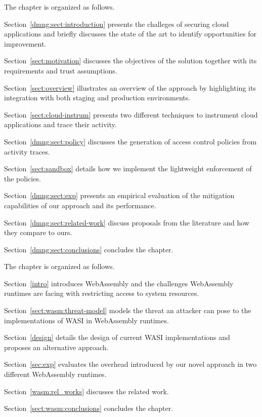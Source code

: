 \smallskip
\noindent The chapter is organized as follows.
\begin{compactitem}
    \item Section~\ref{dmng:sect:introduction} presents the challeges
     of securing cloud applications and briefly discusses the state of
     the art to identify opportunities for improvement.
    \item Section~\ref{sect:motivation} discusses the objectives of
     the solution together with its requirements and trust
     assumptions.
    \item Section~\ref{sect:overview} illustrates an overview of the
     approach by highlighting its integration with both staging and
     production environments.
    \item Section~\ref{sect:cloud-instrum} presents two different
     techniques to instrument cloud applications and trace their
     activity.
    \item Section~\ref{dmng:sect:policy} discusses the generation of
     access control policies from activity traces.
    \item Section~\ref{sect:sandbox} details how we implement the
     lightweight enforcement of the policies.
    \item Section~\ref{dmng:sect:exp} presents an empirical
     evaluation of the mitigation capabilities of our approach and
     its performance.
    \item Section~\ref{dmng:sect:related-work} discuss proposals from
     the literature and how they compare to ours.
    \item Section~\ref{dmng:sect:conclusions} concludes the chapter.
\end{compactitem}
\medskip

\smallskip
\noindent The chapter is organized as follows.
\begin{compactitem}
    \item Section~\ref{intro} introduces WebAssembly and the
     challenges WebAssembly runtimes are facing with restricting
     access to system resources.
    \item Section~\ref{sect:wasm:threat-model} models the threat
     an attacker can pose to the implementations of WASI in
     WebAssembly runtimes.
    \item Section~\ref{design} details the design of current
     WASI implementations and proposes an alternative approach.
    \item Section~\ref{sec:exp} evaluates the overhead introduced by
     our novel approach in two different WebAssembly runtimes.
    \item Section~\ref{wasm:rel_works} discusses the related work.
    \item Section~\ref{sect:wasm:conclusions} concludes the chapter.
\end{compactitem}
\medskip

